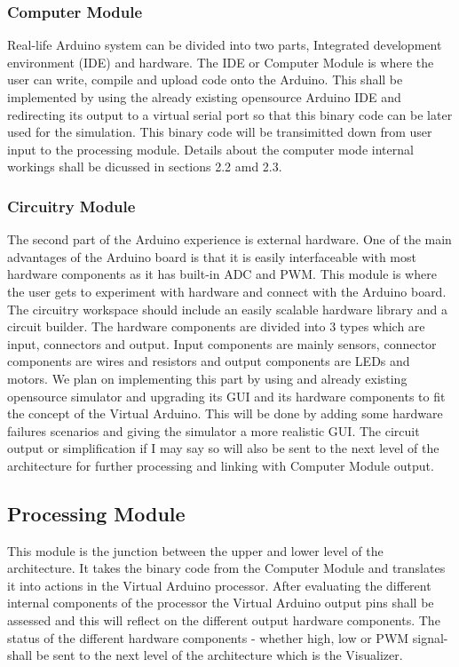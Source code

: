 \subsubsection{Computer Module}
Real-life Arduino system can be divided into two parts, Integrated development environment (IDE) and hardware. The IDE or Computer Module is where the user can write, compile and upload code onto the Arduino. This shall be implemented by using the already existing opensource Arduino IDE and redirecting its output to a virtual serial port so that this binary code can be later used for the simulation. This binary code will be transimitted down from user input to the processing module. Details about the computer mode internal workings shall be dicussed in sections 2.2 amd 2.3.

\subsubsection{Circuitry Module}
The second part of the Arduino experience is external hardware. One of the main advantages of the Arduino board is that it is easily interfaceable with most hardware components as it has built-in ADC and PWM. This module is where the user gets to experiment with hardware and connect with the Arduino board. The circuitry workspace should include an easily scalable hardware library and a circuit builder. The hardware components are divided into 3 types which are input, connectors and output. Input components are mainly sensors, connector components are wires and resistors and output components are LEDs and motors. We plan on implementing this part by using and already existing opensource simulator and upgrading its GUI and its hardware components to fit the concept of the Virtual Arduino. This will be done by adding some hardware failures scenarios and giving the simulator a more realistic GUI. The circuit output or simplification if I may say so will also be sent to the next level of the architecture for further processing and linking with Computer Module output. 

\subsection{Processing Module}
This module is the junction between the upper and lower level of the architecture. It takes the binary code from the Computer Module and translates it into actions in the Virtual Arduino processor. After evaluating the different internal components of the processor the Virtual Arduino output pins shall be assessed and this will reflect on the different output hardware components. The status of the different hardware components - whether high, low or PWM signal- shall be sent to the next level of the architecture which is the Visualizer.

